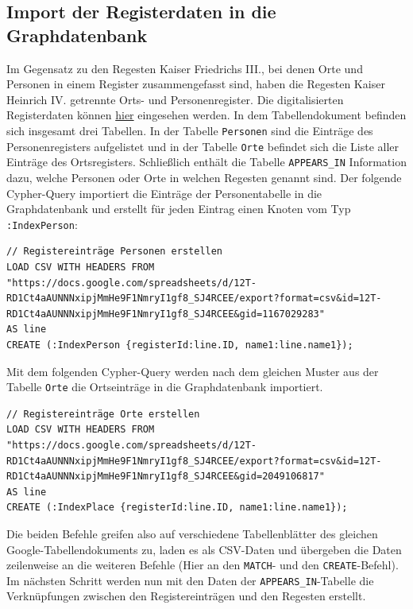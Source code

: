 \documentclass[ngerman,]{scrreprt}
\begin{document}
\hypertarget{import-der-registerdaten-in-die-graphdatenbank-1}{%
\subsection{Import der Registerdaten in die Graphdatenbank}\label{import-der-registerdaten-in-die-graphdatenbank-1}}

Im Gegensatz zu den Regesten Kaiser Friedrichs III., bei denen Orte und Personen in einem Register zusammengefasst sind, haben die Regesten Kaiser Heinrich IV. getrennte Orts- und Personenregister. Die digitalisierten Registerdaten können \href{https://docs.google.com/spreadsheets/d/12T-RD1Ct4aAUNNNxipjMmHe9F1NmryI1gf8_SJ4RCEE/edit?usp=sharing}{hier} eingesehen werden. In dem Tabellendokument befinden sich insgesamt drei Tabellen. In der Tabelle \texttt{Personen} sind die Einträge des Personenregisters aufgelistet und in der Tabelle \texttt{Orte} befindet sich die Liste aller Einträge des Ortsregisters. Schließlich enthält die Tabelle \texttt{APPEARS\_IN} Information dazu, welche Personen oder Orte in welchen Regesten genannt sind. Der folgende Cypher-Query importiert die Einträge der Personentabelle in die Graphdatenbank und erstellt für jeden Eintrag einen Knoten vom Typ \texttt{:IndexPerson}:

\begin{verbatim}
// Registereinträge Personen erstellen
LOAD CSV WITH HEADERS FROM "https://docs.google.com/spreadsheets/d/12T-RD1Ct4aAUNNNxipjMmHe9F1NmryI1gf8_SJ4RCEE/export?format=csv&id=12T-RD1Ct4aAUNNNxipjMmHe9F1NmryI1gf8_SJ4RCEE&gid=1167029283"
AS line
CREATE (:IndexPerson {registerId:line.ID, name1:line.name1});
\end{verbatim}

Mit dem folgenden Cypher-Query werden nach dem gleichen Muster aus der Tabelle \texttt{Orte} die Ortseinträge in die Graphdatenbank importiert.

\begin{verbatim}
// Registereinträge Orte erstellen
LOAD CSV WITH HEADERS FROM "https://docs.google.com/spreadsheets/d/12T-RD1Ct4aAUNNNxipjMmHe9F1NmryI1gf8_SJ4RCEE/export?format=csv&id=12T-RD1Ct4aAUNNNxipjMmHe9F1NmryI1gf8_SJ4RCEE&gid=2049106817"
AS line
CREATE (:IndexPlace {registerId:line.ID, name1:line.name1});
\end{verbatim}

Die beiden Befehle greifen also auf verschiedene Tabellenblätter des gleichen Google-Tabellendokuments zu, laden es als CSV-Daten und übergeben die Daten zeilenweise an die weiteren Befehle (Hier an den \texttt{MATCH}- und den \texttt{CREATE}-Befehl). Im nächsten Schritt werden nun mit den Daten der \texttt{APPEARS\_IN}-Tabelle die Verknüpfungen zwischen den Registereinträgen und den Regesten erstellt.
\end{document}
